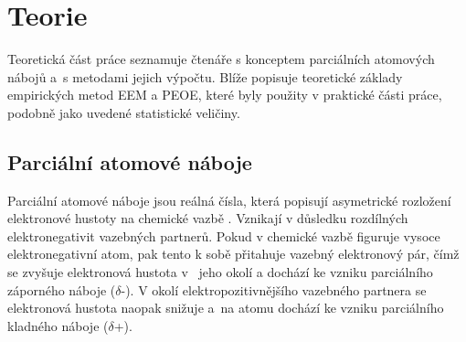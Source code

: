 \chapter{Teorie}

% 
% 
% 
% 
% 
Teoretická část práce seznamuje čtenáře s konceptem parciálních atomových nábojů a~s metodami jejich výpočtu. Blíže popisuje teoretické základy empirických metod EEM a PEOE, které byly použity v praktické části práce, podobně jako uvedené statistické veličiny.

\section{Parciální atomové náboje}

Parciální atomové náboje jsou reálná čísla, která popisují asymetrické rozložení elek\-tronové hustoty na chemické vazbě \cite{Atkins}. Vznikají v důsledku rozdílných elektronegativit vazebných partnerů. Pokud v chemické vazbě figuruje vysoce elektronegativní atom, pak tento k sobě přitahuje vazebný elektronový pár, čímž se zvyšuje elektronová hustota v~ jeho okolí a dochází ke vzniku parciálního záporného náboje ($\delta$-). V okolí elektropozitivnějšího vazebného partnera se elektronová hustota naopak snižuje a~na atomu dochází ke vzniku parciálního kladného náboje ($\delta$+). 

